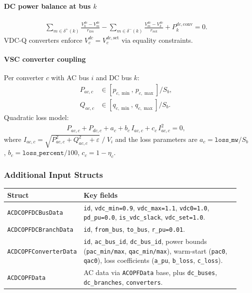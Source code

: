 \paragraph{DC power balance at bus $k$}
\begin{align}
\sum_{m\in\delta^+(k)} \frac{V_k^{dc} - V_m^{dc}}{r_{km}}
- \sum_{m\in\delta^-(k)} \frac{V_m^{dc} - V_k^{dc}}{r_{mk}}
+ P_k^{dc,\mathrm{conv}} = 0.
\end{align}
VDC-Q converters enforce $V_c^{dc} = V_c^{dc,\mathrm{set}}$ via equality
constraints.

\paragraph{VSC converter coupling}

Per converter $c$ with AC bus $i$ and DC bus $k$:
\begin{align}
P_{ac,c} &\in [p_{c,\min},\, p_{c,\max}] / S_b,\\
Q_{ac,c} &\in [q_{c,\min},\, q_{c,\max}] / S_b.
\end{align}
Quadratic loss model:
\begin{align}
P_{ac,c} + P_{dc,c} + a_c + b_c\,I_{ac,c} + c_c\,I_{ac,c}^2 = 0,
\end{align}
where $I_{ac,c} = \sqrt{P_{ac,c}^2 + Q_{ac,c}^2 + \varepsilon}\;/\;V_{i}$
and the loss parameters are
$a_c = \texttt{loss\_mw}/S_b$, $b_c = \texttt{loss\_percent}/100$,
$c_c = 1-\eta_c$.

\subsubsection{Additional Input Structs}

\begin{longtable}{L{0.25\linewidth}L{0.70\linewidth}}
\toprule
Struct & Key fields \\
\midrule
\endhead
\texttt{ACDCOPFDCBusData} & \texttt{id}, \texttt{vdc\_min=0.9}, \texttt{vdc\_max=1.1}, \texttt{vdc0=1.0}, \texttt{pd\_pu=0.0}, \texttt{is\_vdc\_slack}, \texttt{vdc\_set=1.0}. \\
\texttt{ACDCOPFDCBranchData} & \texttt{id}, \texttt{from\_bus}, \texttt{to\_bus}, \texttt{r\_pu=0.01}. \\
\texttt{ACDCOPFConverterData} & \texttt{id}, \texttt{ac\_bus\_id}, \texttt{dc\_bus\_id}, power bounds (\texttt{pac\_min/max}, \texttt{qac\_min/max}), warm-start (\texttt{pac0}, \texttt{qac0}), loss coefficients (\texttt{a\_pu}, \texttt{b\_loss}, \texttt{c\_loss}). \\
\texttt{ACDCOPFData} & AC data via \texttt{ACOPFData} base, plus \texttt{dc\_buses}, \texttt{dc\_branches}, \texttt{converters}. \\
\bottomrule
\end{longtable}

